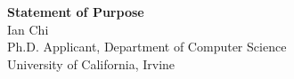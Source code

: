 \documentclass[11pt]{article}
\begin{document}
\begin{center}
    {\Large \textbf{Statement of Purpose}}\\[4pt]
    {\large Ian Chi}\\[2pt]
    Ph.D. Applicant, Department of Computer Science\\
    University of California, Irvine
\end{center}

\vspace{1em}

\end{document}
